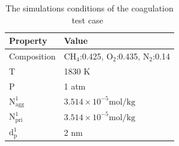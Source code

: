 \begin{table}
	\caption{The simulations conditions of the coagulation test case~\citep{kholghy2021surface}}
	\label{tab:simcond_coagtest}
	\centering
	\begin{tabular}{l l}
		\hline
		\textbf{Property} & \textbf{Value} \\
		\hline
		Composition & $\mathrm{CH_4}$:0.425, $\mathrm{O_2}$:0.435, $\mathrm{N_2}$:0.14\\
		T & 1830 K\\
		P & 1 atm \\
		$\mathrm{N^1_{agg}}$ & $3.514\times10^{-5} \mathrm{mol/kg}$ \\ 
		$\mathrm{N^1_{pri}}$ & $3.514\times10^{-5} \mathrm{mol/kg}$\\
		$\mathrm{d^1_{p}}$ & 2 nm \\
		\hline
	\end{tabular}
\end{table}

